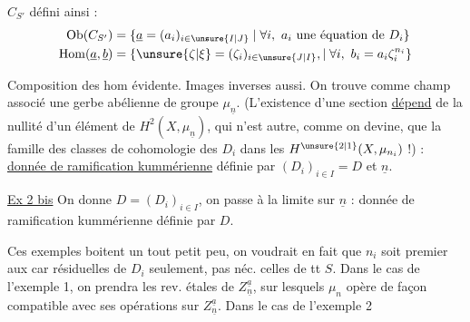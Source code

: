 $C_{S'}$ défini ainsi :
\[
\begin{aligned}
\mathrm{Ob}(C_{S'})&=\{\underline a=(a_i)_{i\in\unsure{I|J}}\mid \forall i,\ a_i\ \text{une équation de }D_i\}\\
\mathrm{Hom}(\underline a,\underline b)&=\{\unsure{\zeta|\xi}=(\zeta_i)_{i\in\unsure{J|I}},\mid\forall i,\ b_i=a_i\zeta_i^{n_i}\}
\end{aligned}
\]

 Composition des hom évidente. Images inverses aussi. On trouve comme champ associé une gerbe abélienne de groupe $\mu_{\underline n}$. (L'existence d'une section \uline{dépend} de la nullité d'un élément de $H^2(X,\mu_{\underline n})$, qui n'est autre, comme on devine, que la famille des classes de cohomologie des $D_i$ dans les $H^{\unsure{2|1}}(X,\mu_{n_i})$ !) : \uline{donnée de ramification kummérienne} définie par $(D_i)_{i\in I}=D$ et $\underline n$.

\uline{Ex 2 bis} On donne $D=(D_i)_{i\in I}$, on passe à la limite sur $\underline n$ : donnée de ramification kummérienne définie par $D$.

Ces exemples boitent un tout petit peu, on voudrait en fait que $n_i$ soit premier aux car résiduelles de $D_i$ seulement, pas néc. celles de tt $S$. Dans le cas de l'exemple 1, on prendra les rev. étales de $Z_{\underline n}^{\underline a}$, sur lesquels $\mu_n$ opère de façon compatible avec ses opérations sur $Z_{\underline n}^{\underline a}$. Dans le cas de l'exemple 2
